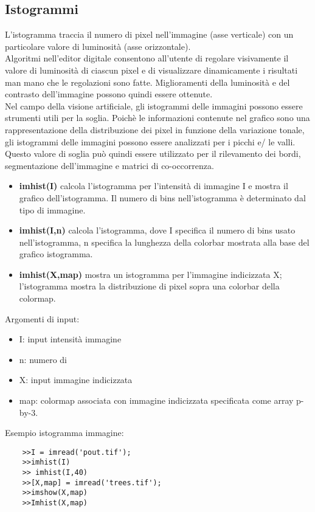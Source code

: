 \documentclass[a4paper, 10pt]{article}
\begin{document}
\subsection{Istogrammi}
L'istogramma traccia il numero di pixel nell'immagine (asse verticale) con un particolare valore di luminosità (asse orizzontale).\\
Algoritmi nell'editor digitale consentono all'utente di regolare visivamente il valore di luminosità di ciascun pixel e di visualizzare dinamicamente i risultati man mano che le regolazioni sono fatte. Miglioramenti della luminosità e del contrasto dell'immagine possono quindi essere ottenute.\\
Nel campo della visione artificiale, gli istogrammi delle immagini possono essere strumenti utili per la soglia. Poichè le informazioni contenute nel grafico sono una rappresentazione della distribuzione dei pixel in funzione della variazione tonale, gli istogrammi delle immagini possono essere analizzati per i picchi e/ le valli. Questo valore di soglia può quindi essere utilizzato per il rilevamento dei bordi,
segmentazione dell'immagine e matrici di co-occorrenza.
\begin{itemize}
\item \textbf{imhist(I)} calcola l'istogramma per l'intensità di immagine I e mostra il grafico dell'istogramma. Il numero di bins nell'istogramma è determinato dal tipo di immagine.
\item \textbf{imhist(I,n)} calcola l'istogramma, dove I specifica il numero di bins usato nell'istogramma, n specifica la lunghezza della colorbar mostrata alla base del grafico istogramma.
\item \textbf{imhist(X,map)} mostra un istogramma per l'immagine indicizzata X; l'istogramma mostra la distribuzione di pixel sopra una colorbar della colormap.
\end{itemize}
Argomenti di input:
\begin{itemize}
\item I: input intensità immagine
\item n: numero di 
\item X: input immagine indicizzata
\item map: colormap associata con immagine indicizzata specificata come array p-by-3.
\end{itemize}
Esempio istogramma immagine:
\begin{lstlisting}
	>>I = imread('pout.tif');
	>>imhist(I)
	>> imhist(I,40)
	>>[X,map] = imread('trees.tif');
	>>imshow(X,map)
	>>Imhist(X,map)
\end{lstlisting}
\end{document}
